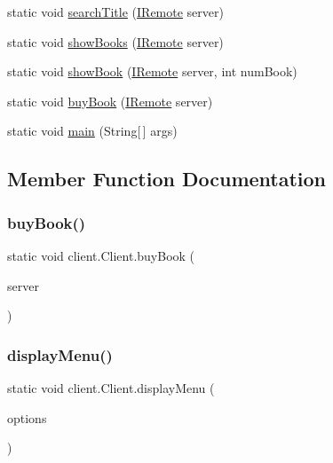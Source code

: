 \begin{DoxyCompactItemize}
\item 
static void \hyperlink{classclient_1_1_client_afb1d6e6867ef984522fd421609af72d0}{search\+Title} (\hyperlink{interfaceserver_1_1remote_1_1_i_remote}{I\+Remote} server)
\item 
static void \hyperlink{classclient_1_1_client_a7ff06b01e82b762056fc7a56e7e58d3d}{show\+Books} (\hyperlink{interfaceserver_1_1remote_1_1_i_remote}{I\+Remote} server)
\item 
static void \hyperlink{classclient_1_1_client_ab3d8c13b4e7328d94819a5300e3c5743}{show\+Book} (\hyperlink{interfaceserver_1_1remote_1_1_i_remote}{I\+Remote} server, int num\+Book)
\item 
static void \hyperlink{classclient_1_1_client_af958ee4c0fed811e49eaa3ee74ae09bf}{buy\+Book} (\hyperlink{interfaceserver_1_1remote_1_1_i_remote}{I\+Remote} server)
\item 
static void \hyperlink{classclient_1_1_client_a535f4e7494d7095589ebf11a8d8f50df}{main} (String\mbox{[}$\,$\mbox{]} args)
\end{DoxyCompactItemize}


\subsection{Member Function Documentation}
\mbox{\label{classclient_1_1_client_af958ee4c0fed811e49eaa3ee74ae09bf}} 
\subsubsection{\texorpdfstring{buy\+Book()}{buyBook()}}
{\footnotesize\ttfamily static void client.\+Client.\+buy\+Book (\begin{DoxyParamCaption}\item[{\hyperlink{interfaceserver_1_1remote_1_1_i_remote}{I\+Remote}}]{server }\end{DoxyParamCaption})\hspace{0.3cm}{\ttfamily [static]}}

\mbox{\label{classclient_1_1_client_a54355debc9ffcc61540f7f39241a8a77}} 
\subsubsection{\texorpdfstring{display\+Menu()}{displayMenu()}}
{\footnotesize\ttfamily static void client.\+Client.\+display\+Menu (\begin{DoxyParamCaption}\item[{String \mbox{[}$\,$\mbox{]}}]{options }\end{DoxyParamCaption})\hspace{0.3cm}{\ttfamily [static]}}

